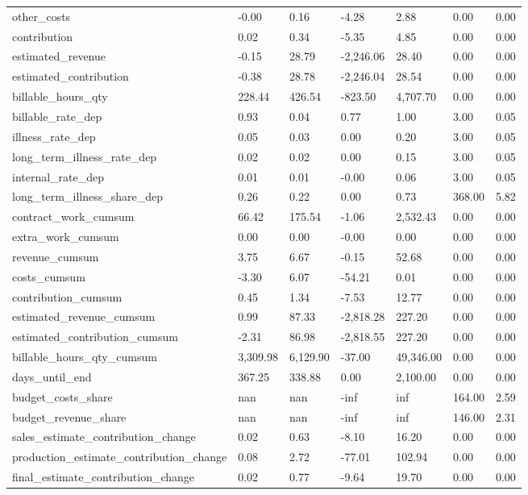 \begin{landscape}
\begin{longtable}[h!]{lllllll}
other_costs & -0.00 & 0.16 & -4.28 & 2.88 & 0.00 & 0.00 \\
contribution & 0.02 & 0.34 & -5.35 & 4.85 & 0.00 & 0.00 \\
estimated_revenue & -0.15 & 28.79 & -2,246.06 & 28.40 & 0.00 & 0.00 \\
estimated_contribution & -0.38 & 28.78 & -2,246.04 & 28.54 & 0.00 & 0.00 \\
billable_hours_qty & 228.44 & 426.54 & -823.50 & 4,707.70 & 0.00 & 0.00 \\
billable_rate_dep & 0.93 & 0.04 & 0.77 & 1.00 & 3.00 & 0.05 \\
illness_rate_dep & 0.05 & 0.03 & 0.00 & 0.20 & 3.00 & 0.05 \\
long_term_illness_rate_dep & 0.02 & 0.02 & 0.00 & 0.15 & 3.00 & 0.05 \\
internal_rate_dep & 0.01 & 0.01 & -0.00 & 0.06 & 3.00 & 0.05 \\
long_term_illness_share_dep & 0.26 & 0.22 & 0.00 & 0.73 & 368.00 & 5.82 \\
contract_work_cumsum & 66.42 & 175.54 & -1.06 & 2,532.43 & 0.00 & 0.00 \\
extra_work_cumsum & 0.00 & 0.00 & -0.00 & 0.00 & 0.00 & 0.00 \\
revenue_cumsum & 3.75 & 6.67 & -0.15 & 52.68 & 0.00 & 0.00 \\
costs_cumsum & -3.30 & 6.07 & -54.21 & 0.01 & 0.00 & 0.00 \\
contribution_cumsum & 0.45 & 1.34 & -7.53 & 12.77 & 0.00 & 0.00 \\
estimated_revenue_cumsum & 0.99 & 87.33 & -2,818.28 & 227.20 & 0.00 & 0.00 \\
estimated_contribution_cumsum & -2.31 & 86.98 & -2,818.55 & 227.20 & 0.00 & 0.00 \\
billable_hours_qty_cumsum & 3,309.98 & 6,129.90 & -37.00 & 49,346.00 & 0.00 & 0.00 \\
days_until_end & 367.25 & 338.88 & 0.00 & 2,100.00 & 0.00 & 0.00 \\
budget_costs_share & nan & nan & -inf & inf & 164.00 & 2.59 \\
budget_revenue_share & nan & nan & -inf & inf & 146.00 & 2.31 \\
sales_estimate_contribution_change & 0.02 & 0.63 & -8.10 & 16.20 & 0.00 & 0.00 \\
production_estimate_contribution_change & 0.08 & 2.72 & -77.01 & 102.94 & 0.00 & 0.00 \\
final_estimate_contribution_change & 0.02 & 0.77 & -9.64 & 19.70 & 0.00 & 0.00 \\

\end{longtable}
\end{landscape}
